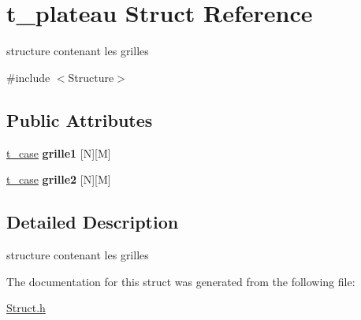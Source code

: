 \hypertarget{structt__plateau}{}\section{t\+\_\+plateau Struct Reference}
\label{structt__plateau}


structure contenant les grilles  




{\ttfamily \#include $<$Structure$>$}

\subsection*{Public Attributes}
\begin{DoxyCompactItemize}
\item 
\hypertarget{structt__plateau_af9ec4fe4fab6c92231a8a13a09bf7596}{}\hyperlink{structt__case}{t\+\_\+case} {\bfseries grille1} \mbox{[}N\mbox{]}\mbox{[}M\mbox{]}\label{structt__plateau_af9ec4fe4fab6c92231a8a13a09bf7596}

\item 
\hypertarget{structt__plateau_a3bffa4b223e7c4b44521ffb4f0de024a}{}\hyperlink{structt__case}{t\+\_\+case} {\bfseries grille2} \mbox{[}N\mbox{]}\mbox{[}M\mbox{]}\label{structt__plateau_a3bffa4b223e7c4b44521ffb4f0de024a}

\end{DoxyCompactItemize}


\subsection{Detailed Description}
structure contenant les grilles 

The documentation for this struct was generated from the following file\+:\begin{DoxyCompactItemize}
\item 
\hyperlink{_struct_8h}{Struct.\+h}\end{DoxyCompactItemize}
